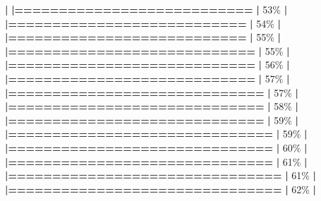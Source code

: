 \documentclass[
]{book}
\newenvironment{Shaded}{\begin{snugshade}}{\end{snugshade}}
\newcommand{\DecValTok}[1]{\textcolor[rgb]{0.00,0.00,0.81}{#1}}
\newcommand{\ErrorTok}[1]{\textcolor[rgb]{0.64,0.00,0.00}{\textbf{#1}}}
\newcommand{\NormalTok}[1]{#1}
\newcommand{\SpecialCharTok}[1]{\textcolor[rgb]{0.81,0.36,0.00}{\textbf{#1}}}
\begin{document}
\begin{Shaded}
\begin{Highlighting}[]
  \SpecialCharTok{|}                                                        
  \ErrorTok{|===========================}                       \ErrorTok{|}  \DecValTok{53}\NormalTok{\%}
  \SpecialCharTok{|}                                                        
  \ErrorTok{|===========================}                       \ErrorTok{|}  \DecValTok{54}\NormalTok{\%}
  \SpecialCharTok{|}                                                        
  \ErrorTok{|===========================}                       \ErrorTok{|}  \DecValTok{55}\NormalTok{\%}
  \SpecialCharTok{|}                                                        
  \ErrorTok{|============================}                      \ErrorTok{|}  \DecValTok{55}\NormalTok{\%}
  \SpecialCharTok{|}                                                        
  \ErrorTok{|============================}                      \ErrorTok{|}  \DecValTok{56}\NormalTok{\%}
  \SpecialCharTok{|}                                                        
  \ErrorTok{|============================}                      \ErrorTok{|}  \DecValTok{57}\NormalTok{\%}
  \SpecialCharTok{|}                                                        
  \ErrorTok{|=============================}                     \ErrorTok{|}  \DecValTok{57}\NormalTok{\%}
  \SpecialCharTok{|}                                                        
  \ErrorTok{|=============================}                     \ErrorTok{|}  \DecValTok{58}\NormalTok{\%}
  \SpecialCharTok{|}                                                        
  \ErrorTok{|=============================}                     \ErrorTok{|}  \DecValTok{59}\NormalTok{\%}
  \SpecialCharTok{|}                                                        
  \ErrorTok{|==============================}                    \ErrorTok{|}  \DecValTok{59}\NormalTok{\%}
  \SpecialCharTok{|}                                                        
  \ErrorTok{|==============================}                    \ErrorTok{|}  \DecValTok{60}\NormalTok{\%}
  \SpecialCharTok{|}                                                        
  \ErrorTok{|==============================}                    \ErrorTok{|}  \DecValTok{61}\NormalTok{\%}
  \SpecialCharTok{|}                                                        
  \ErrorTok{|===============================}                   \ErrorTok{|}  \DecValTok{61}\NormalTok{\%}
  \SpecialCharTok{|}                                                        
  \ErrorTok{|===============================}                   \ErrorTok{|}  \DecValTok{62}\NormalTok{\%}
  \SpecialCharTok{|}                                                        

\end{Highlighting}
\end{Shaded}
\end{document}
